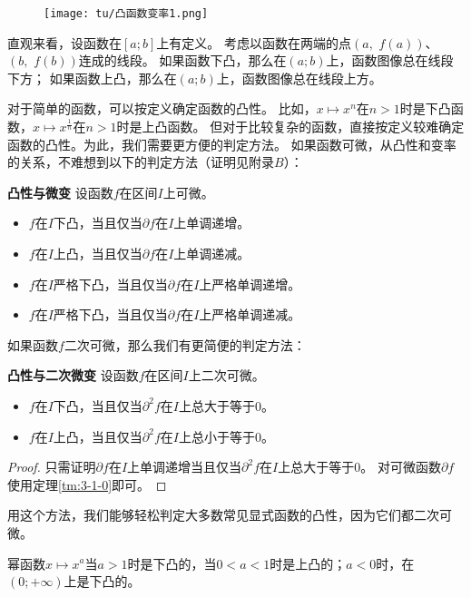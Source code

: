 \documentclass[12pt,UTF8]{ctexbook}
\begin{document}
\begin{figure}[h]
    \centering
    \texttt{[image: tu/凸函数变率1.png]}
\end{figure}

直观来看，设函数在$[a; b]$上有定义。
考虑以函数在两端的点$(a,\,\, f(a))$、$(b,\,\, f(b))$连成的线段。
如果函数下凸，那么在$(a;b)$上，函数图像总在线段下方；
如果函数上凸，那么在$(a;b)$上，函数图像总在线段上方。

对于简单的函数，可以按定义确定函数的凸性。
比如，$x\mapsto x^n$在$n>1$时是下凸函数，$x\mapsto x^\frac{1}{n}$在$n>1$时是上凸函数。
但对于比较复杂的函数，直接按定义较难确定函数的凸性。为此，我们需要更方便的判定方法。
如果函数可微，从凸性和变率的关系，不难想到以下的判定方法（证明见附录$B$）：

\begin{tm}{\textbf{凸性与微变}}
    设函数$f$在区间$I$上可微。
    \begin{itemize}
        \item $f$在$I$下凸，当且仅当$\partial f$在$I$上单调递增。
        \item $f$在$I$上凸，当且仅当$\partial f$在$I$上单调递减。
        \item $f$在$I$严格下凸，当且仅当$\partial f$在$I$上严格单调递增。
        \item $f$在$I$严格下凸，当且仅当$\partial f$在$I$上严格单调递减。
    \end{itemize}
\end{tm}

如果函数$f$二次可微，那么我们有更简便的判定方法：
\begin{tm}\textbf{凸性与二次微变}
    设函数$f$在区间$I$上二次可微。
    \begin{itemize}
        \item $f$在$I$下凸，当且仅当$\partial^2 f$在$I$上总大于等于$0$。
        \item $f$在$I$上凸，当且仅当$\partial^2 f$在$I$上总小于等于$0$。
    \end{itemize}
\end{tm}

\begin{proof}
    只需证明$\partial f$在$I$上单调递增当且仅当$\partial^2 f$在$I$上总大于等于$0$。
    对可微函数$\partial f$使用定理\ref{tm:3-1-0}即可。
\end{proof}

用这个方法，我们能够轻松判定大多数常见显式函数的凸性，因为它们都二次可微。

幂函数$x\mapsto x^a$当$a>1$时是下凸的，当$0<a<1$时是上凸的；$a<0$时，在$(0;+\infty)$上是下凸的。
\end{document}
